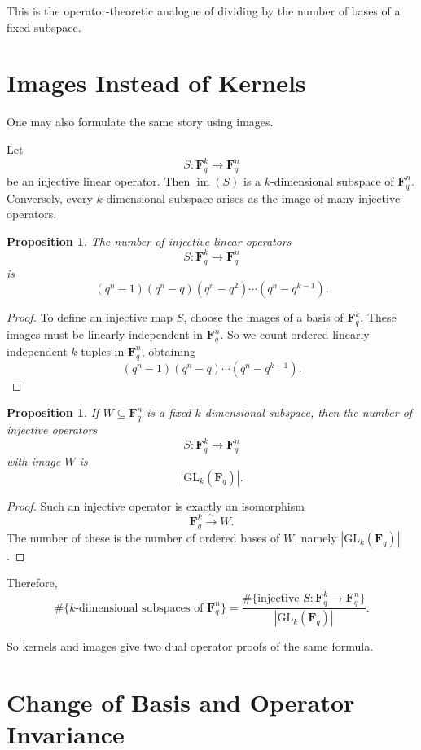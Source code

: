 \documentclass[11pt]{article}
\newtheorem{proposition}[theorem]{Proposition}
\theoremstyle{definition}
\theoremstyle{remark}
\newcommand{\F}{\mathbf{F}}
\newcommand{\GL}{\mathrm{GL}}
\newcommand{\im}{\operatorname{im}}
\begin{document}
	This is the operator-theoretic analogue of dividing by the number of bases of a fixed subspace.
	
	\section{Images Instead of Kernels}
	
	One may also formulate the same story using images.
	
	Let
	\[
	S:\F_q^k\to \F_q^n
	\]
	be an injective linear operator. Then \(\im(S)\) is a \(k\)-dimensional subspace of \(\F_q^n\). Conversely, every \(k\)-dimensional subspace arises as the image of many injective operators.
	
	\begin{proposition}
		The number of injective linear operators
		\[
		S:\F_q^k\to \F_q^n
		\]
		is
		\[
		(q^n-1)(q^n-q)(q^n-q^2)\cdots(q^n-q^{k-1}).
		\]
	\end{proposition}
	
	\begin{proof}
		To define an injective map \(S\), choose the images of a basis of \(\F_q^k\). These images must be linearly independent in \(\F_q^n\). So we count ordered linearly independent \(k\)-tuples in \(\F_q^n\), obtaining
		\[
		(q^n-1)(q^n-q)\cdots(q^n-q^{k-1}).
		\]
	\end{proof}
	
	\begin{proposition}
		If \(W\subseteq \F_q^n\) is a fixed \(k\)-dimensional subspace, then the number of injective operators
		\[
		S:\F_q^k\to \F_q^n
		\]
		with image \(W\) is
		\[
		|\GL_k(\F_q)|.
		\]
	\end{proposition}
	
	\begin{proof}
		Such an injective operator is exactly an isomorphism
		\[
		\F_q^k \xrightarrow{\sim} W.
		\]
		The number of these is the number of ordered bases of \(W\), namely \(|\GL_k(\F_q)|\).
	\end{proof}
	
	Therefore,
	\[
	\#\{\text{\(k\)-dimensional subspaces of }\F_q^n\}
	=
	\frac{\#\{\text{injective }S:\F_q^k\to \F_q^n\}}
	{|\GL_k(\F_q)|}.
	\]
	
	So kernels and images give two dual operator proofs of the same formula.
	
	\section{Change of Basis and Operator Invariance}
	
\end{document}
